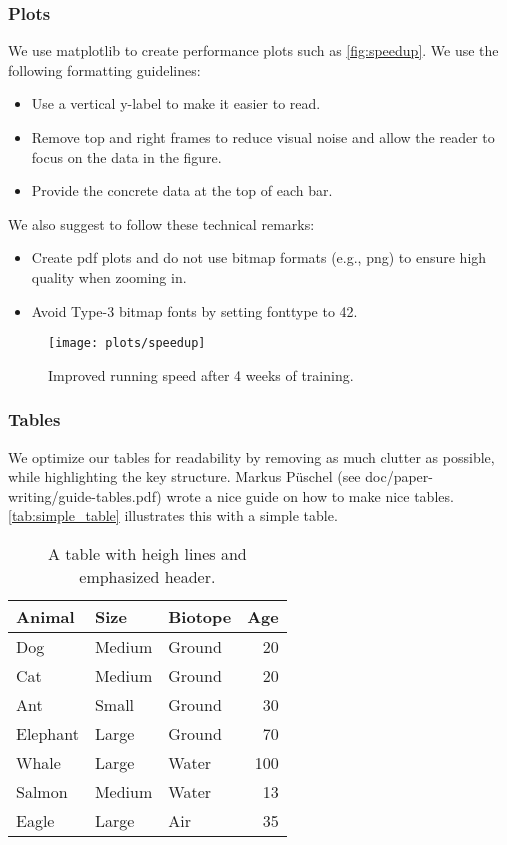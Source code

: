 \documentclass[review, anonymous, acmsmall]{acmart}
\newenvironment{draftonly}{}{}
\newcommand{\ra}[1]{\renewcommand{\arraystretch}{#1}}
\begin{document}
\begin{draftonly}
\subsubsection{Plots} We use matplotlib to create performance
plots such as \autoref{fig:speedup}. We use the following
formatting guidelines:
\begin{itemize}
  \item Use a vertical y-label to make it easier to read.
  \item Remove top and right frames to reduce visual noise
	and allow the reader to focus on the data in the
	figure.
  \item Provide the concrete data at the top of each bar.
\end{itemize}

\noindent
We also suggest to follow these technical remarks:
\begin{itemize}
  \item Create pdf plots and do not use bitmap formats (e.g., png) to
	ensure high quality when zooming in.
  \item Avoid Type-3 bitmap fonts by
	setting fonttype to 42.
\end{itemize}

\begin{figure}
\texttt{[image: plots/speedup]}
\caption{Improved running speed after 4 weeks of training.
}
\label{fig:speedup}
\end{figure}

\subsubsection{Tables} We optimize our tables for readability by removing as
much clutter as possible, while highlighting the key structure. Markus Püschel
(see doc/paper-writing/guide-tables.pdf) wrote a nice guide on how to make nice
tables. \autoref{tab:simple_table} illustrates this with a simple
table.

\begin{table}
\ra{1.2}
\centering
\begin{tabular}{l l l r}
  \toprule
  \textbf{Animal} & \textbf{Size} & \textbf{Biotope} & \textbf{Age}\\
  \midrule
  Dog & Medium & Ground & 20\\
  Cat & Medium & Ground &20 \\
  Ant & Small & Ground & 30 \\
  Elephant & Large & Ground & 70\\
  Whale & Large & Water & 100\\
  Salmon & Medium & Water & 13 \\
  Eagle & Large & Air & 35 \\
  \bottomrule
\end{tabular}
\vspace{1em}
\caption{A table with heigh lines and emphasized header.}
\label{tab:simple_table}
\end{table}


\end{draftonly}
\end{document}
